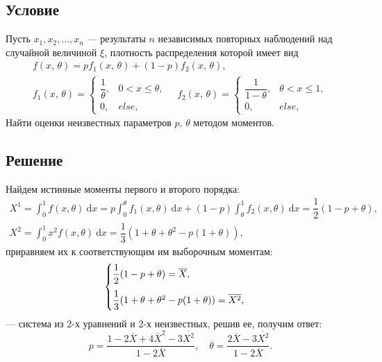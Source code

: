 \documentclass[12pt, a4paper]{article}
\begin{document}
		\subsection*{Условие}	
			Пусть $x_1, x_2, \dots, x_n$ --- результаты $n$ независимых повторных наблюдений над случайной величиной $\xi$, плотность распределения которой имеет вид
			\begin{gather*}
				f(x,\,\theta) = 
				p f_1(x,\,\theta) + (1 - p) f_2(x,\,\theta), \\
				f_1(x,\,\theta) = 
				\begin{cases}
					\dfrac{1}{\theta}, &0 < x \leqslant \theta, \\
					0, &else,
				\end{cases} 
				\quad 
				f_2(x,\,\theta) = 
				\begin{cases}
					\dfrac{1}{1 - \theta}, &\theta < x \leqslant 1, \\
					0, &else,
				\end{cases}
			\end{gather*}
			Найти оценки неизвестных параметров $p$, $\theta$ методом моментов.
		\subsection*{Решение}
			Найдем истинные моменты первого и второго порядка: 
			\begin{gather*}
				X^1 = \int_{0}^{1} f(x, \theta) \ \mathrm{d} x = 
				p \int_{0}^{\theta} f_1(x, \theta) \ \mathrm{d} x + 
				(1 - p) \int_{\theta}^{1} f_2(x, \theta) \ \mathrm{d} x = 
				\dfrac{1}{2} (1 - p + \theta),\\
				X^2 = \int_{0}^{1} x^2 f(x, \theta) \ \mathrm{d} x = 
				\dfrac{1}{3} (1 + \theta + \theta^2 - p ( 1 + \theta)),
			\end{gather*}
			приравняем их к соответствующим им выборочным моментам: 
			\begin{gather*}
				\begin{cases}
					\dfrac{1}{2} (1 - p + \theta) = \overline{X},\\
					\dfrac{1}{3} (1 + \theta + \theta^2 - p ( 1 + \theta)) = \overline{X^2},\phantom{\vline height 2em}
				\end{cases}
			\end{gather*}
			--- система из 2-х уравнений и 2-х неизвестных, решив ее, получим ответ: 
			$$
				p = \dfrac{1-2\overline{X} + 4 \overline{X}^2 - 3 \overline{X^2}}{1 - 2 \overline{X}}, 
				\quad
				\theta = \dfrac{2 \overline{X} - 3 \overline{X^2}}{1 - 2 \overline{X}}.
			$$
			
			
	
\end{document}
